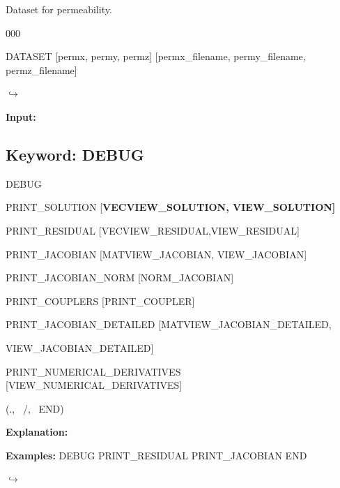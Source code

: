 \documentclass[12pt]{article}
\newcommand\keyend{{(., \, /, \, END)}}
\newcommand\return{{\hfill$\hookrightarrow$}}
\begin{document}

 Dataset for permeability.

\begin{deflist}{000}
\item[DATASET] [permx, permy, permz] [permx\_filename, permy\_filename, permz\_filename]
\end{deflist}

\hyperlink{target_key}{\return}


\newpage
\protect\hypertarget{target_dbg}{}

{\noindent\bf Input:}

\subsection{Keyword: DEBUG}
\begin{deflist}{00}
\item[DEBUG]~
\begin{deflist}{00}
\item[PRINT\_SOLUTION] [\bf VECVIEW\_SOLUTION, VIEW\_SOLUTION]
\item[PRINT\_RESIDUAL] [VECVIEW\_RESIDUAL,VIEW\_RESIDUAL]
\item[PRINT\_JACOBIAN] [MATVIEW\_JACOBIAN, VIEW\_JACOBIAN]
\item[PRINT\_JACOBIAN\_NORM] [NORM\_JACOBIAN]
\item[PRINT\_COUPLERS] [PRINT\_COUPLER]
\item[PRINT\_JACOBIAN\_DETAILED] [MATVIEW\_JACOBIAN\_DETAILED, 

VIEW\_JACOBIAN\_DETAILED]

\item[PRINT\_NUMERICAL\_DERIVATIVES] [VIEW\_NUMERICAL\_DERIVATIVES]

\end{deflist}
\item[\keyend]
\end{deflist}

{\noindent\bf Explanation:}

\bigskip

{\noindent\bf Examples:}
DEBUG
  PRINT_RESIDUAL
  PRINT_JACOBIAN
END

\hyperlink{target_key}{\return}
\end{document}
